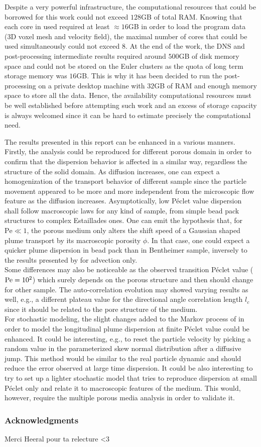 Despite a very powerful infrastructure, the computational resources that could be borrowed for this work could not exceed $128$GB of total RAM. 
Knowing that each core in used required at least $\approx 16$GB in order to load the program data (3D voxel mesh and velocity field), the maximal number of cores that could be used simultaneously could not exceed 8.
At the end of the work, the DNS and post-processing intermediate results required around $500$GB of disk memory space and could not be stored on the Euler clusters as the quota of long term storage memory was $16$GB. 
This is why it has been decided to run the post-processing on a private desktop machine with $32$GB of RAM and enough memory space to store all the data.
Hence, the availability computational resources must be well established before attempting such work and an excess of storage capacity is always welcomed since it can be hard to estimate precisely the computational need.

The results presented in this report can be enhanced in a various manners.
Firstly, the analysis could be reproduced for different porous domain in order to confirm that the dispersion behavior is affected in a similar way, regardless the structure of the solid domain.
As diffusion increases, one can expect a homogenization of the transport behavior of different sample since the particle movement appeared to be more and more independent from the microscopic flow feature as the diffusion increases.
Asymptotically, low Péclet value dispersion shall follow macroscopic laws for any kind of sample, from simple bead pack structures to complex Estaillades ones.
One can emit the hypothesis that, for $\mathrm{Pe}\ll 1$, the porous medium only alters the shift speed of a Gaussian shaped plume transport by its macroscopic porosity $\phi$. 
In that case, one could expect a quicker plume dispersion in bead pack than in Bentheimer sample, inversely to the results presented by \cite{Meyer2016} for advection only.\\
Some differences may also be noticeable as the observed transition Péclet value ($\mathrm{Pe}=10^2$) which surely depends on the porous structure and then should change for other sample. 
The auto-correlation evolution may showed varying results as well, e.g., a different plateau value for the directional angle correlation length $l_c$ since it should be related to the pore structure of the medium.\\
For stochastic modeling, the slight changes added to the Markov process of \citet{Meyer2016} in order to model the longitudinal plume dispersion at finite Péclet value could be enhanced.
It could be interesting, e.g., to reset the particle velocity by picking a random value in the parameterized skew normal distribution after a diffusive jump. 
This method would be similar to the real particle dynamic and should reduce the error observed at large time dispersion.
It could be also interesting to try to set up a lighter stochastic model that tries to reproduce dispersion at small Péclet only and relate it to macroscopic features of the medium.
This would, however, require the multiple porous media analysis in order to validate it.

\subsubsection{Acknowledgments}
Merci Heeral pour ta relecture <3